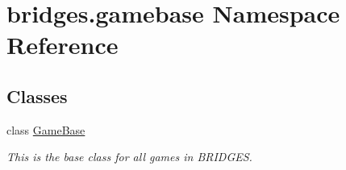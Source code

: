 \hypertarget{namespacebridges_1_1gamebase}{}\section{bridges.\+gamebase Namespace Reference}
\label{namespacebridges_1_1gamebase}
\subsection*{Classes}
\begin{DoxyCompactItemize}
\item 
class \hyperlink{classbridges_1_1gamebase_1_1_game_base}{Game\+Base}
\begin{DoxyCompactList}\small\item\em This is the base class for all games in B\+R\+I\+D\+G\+ES. \end{DoxyCompactList}\end{DoxyCompactItemize}
